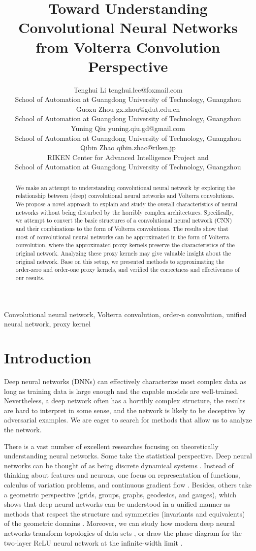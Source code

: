 \documentclass[twoside,11pt]{article}
\title{
  Toward Understanding Convolutional Neural Networks from Volterra Convolution Perspective%
}
\author{%
  \name Tenghui Li  \email tenghui.lee@foxmail.com \\
  \addr School of Automation at Guangdong University of Technology, Guangzhou \\
  \AND
  \name Guoxu Zhou \email gx.zhou@gdut.edu.cn\\
  \addr School of Automation at Guangdong University of Technology, Guangzhou \\
  \AND
  \name Yuning Qiu \email yuning.qiu.gd@gmail.com\\
  \addr School of Automation at Guangdong University of Technology, Guangzhou \\
  \AND
  \name Qibin Zhao \email qibin.zhao@riken.jp \\
  \addr RIKEN Center for Advanced Intelligence Project and \\
  School of Automation at Guangdong University of Technology, Guangzhou \\
}%
\begin{document}
\maketitle

\begin{abstract}%
  We make an attempt to understanding
  convolutional neural network by exploring the relationship between (deep) convolutional neural networks and Volterra convolutions.
  We propose a novel approach to explain and  study the overall characteristics of neural networks without being disturbed by the horribly complex architectures.
  Specifically, we  attempt to convert the basic structures of a convolutional neural network (CNN) and their combinations to the form of Volterra convolutions.
  The results show that most of convolutional neural networks can be approximated in the form of Volterra convolution, where the approximated proxy kernels preserve the characteristics of the original network. Analyzing these proxy kernels may give valuable insight about the original network.
  Base on this setup, we presented methods to approximating the order-zero and order-one proxy kernels, and verified the correctness and effectiveness of our results.
\end{abstract}

\begin{keywords}
  Convolutional neural network,
  Volterra convolution,
  order-n convolution,
  unified neural network,
  proxy kernel
\end{keywords}

\section{Introduction}
\label{sec:introduction}

Deep neural networks (DNNs) can effectively characterize most complex data as long as training data is large enough and the capable models are well-trained.
Nevertheless, a deep network often has a horribly complex structure, the results are hard to interpret in some sense, and the network is likely to be deceptive by adversarial examples.
We are eager to search for methods that allow us to analyze the network.

There is a vast number of excellent researches focusing on theoretically understanding neural networks.
Some take the statistical perspective.
Deep neural networks can be thought of as being discrete dynamical systems \citep{Weinan2017}.
Instead of thinking about features and neurons, one focus on representation of functions, calculus of variation problems, and continuous gradient flow \citep{E2019}.
Besides, others take a geometric perspective (grids, groups, graphs, geodesics, and gauges), which shows that deep neural networks can be understood in a unified manner as methods that respect the structure and symmetries (invariants and equivalents) of the geometric domains \citep{Bronstein2021}.
Moreover, we can study how modern deep neural networks transform topologies of data sets \citep{Naitzat2020}, or draw the phase diagram for the two-layer ReLU neural network at the infinite-width limit \citep{Luo2021}.
\end{document}
